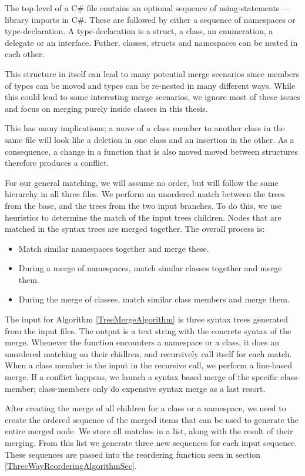\documentclass[11pt]{article}
\begin{document}
The top level of a C\# file contains an optional sequence of using-statements --- library imports in C\#. These are followed by either a sequence of namespaces or type-declaration. A type-declaration is a struct, a class, an enumeration, a delegate or an interface. Futher, classes, structs and namespaces can be nested in each other.

This structure in itself can lead to many potential merge scenarios since members of types can be moved and types can be re-nested in many different ways. While this could lead to some interesting merge scenarios, we ignore most of these issues and focus on merging purely inside classes in this thesis.

This has many implications; a move of a class member to another class in the same file will look like a deletion in one class and an insertion in the other. As a consequence, a change in a function that is also moved moved between structures therefore produces a conflict.

For our general matching, we will assume no order, but will follow the same hierarchy in all three files. We perform an unordered match between the trees from the base, and the trees from the two input branches. To do this, we use heuristics to determine the match of the input trees children. Nodes that are matched in the syntax trees are merged together. The overall process is:

\begin{itemize}
   \item Match similar namespaces together and merge these.
   \item During a merge of namespaces, match similar classes together and merge them.
   \item During the merge of classes, match similar class members and merge them.
\end{itemize}

The input for Algorithm \ref{TreeMergeAlgorithm} is three syntax trees generated from the input files. The output is a text string with the concrete syntax of the merge. Whenever the function encounters a namespace or a class, it does an unordered matching on their chidlren, and recursively call itself for each match. When a class member is the input in the recursive call, we perform a line-based merge. If a conflict happens, we launch a syntax based merge of the specific class-member; class-members only do expensive syntax merge as a last resort.

After creating the merge of all children for a class or a namespace, we need to create the ordered sequence of the merged items that can be used to generate the entire merged node. We store all matches in a list, along with the result of their merging. From this list we generate three new sequences for each input sequence. These sequences are passed into the reordering function seen in section \ref{ThreeWayReorderingAlgorithmSec}.
\end{document}

